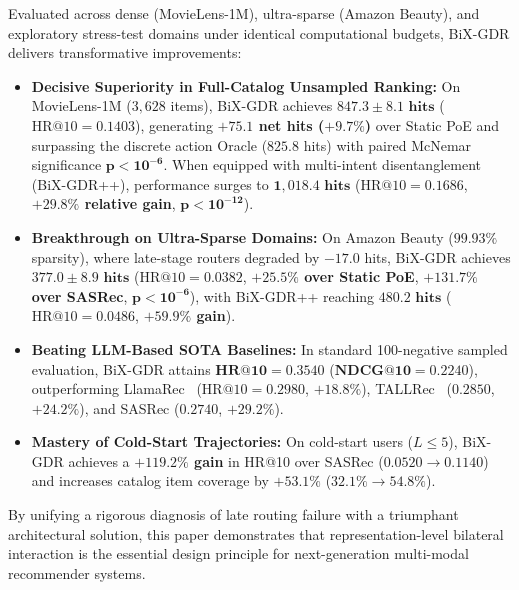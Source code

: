 Evaluated across dense (MovieLens-1M), ultra-sparse (Amazon Beauty), and exploratory stress-test domains under identical computational budgets, BiX-GDR delivers transformative improvements:
\begin{itemize}[leftmargin=*]
    \item \textbf{Decisive Superiority in Full-Catalog Unsampled Ranking:} On MovieLens-1M ($3{,}628$ items), BiX-GDR achieves $\mathbf{847.3 \pm 8.1\text{ hits}}$ ($\text{HR@10} = 0.1403$), generating \textbf{$+75.1$ net hits ($+9.7\%$)} over Static PoE and surpassing the discrete action Oracle ($825.8$ hits) with paired McNemar significance $\mathbf{p < 10^{-6}}$. When equipped with multi-intent disentanglement (BiX-GDR++), performance surges to $\mathbf{1{,}018.4\text{ hits}}$ ($\text{HR@10} = 0.1686$, \textbf{$+29.8\%$ relative gain}, $\mathbf{p < 10^{-12}}$).
    \item \textbf{Breakthrough on Ultra-Sparse Domains:} On Amazon Beauty ($99.93\%$ sparsity), where late-stage routers degraded by $-17.0$ hits, BiX-GDR achieves $\mathbf{377.0 \pm 8.9\text{ hits}}$ ($\text{HR@10} = 0.0382$, \textbf{$+25.5\%$ over Static PoE}, \textbf{$+131.7\%$ over SASRec}, $\mathbf{p < 10^{-6}}$), with BiX-GDR++ reaching $\mathbf{480.2\text{ hits}}$ ($\text{HR@10} = 0.0486$, \textbf{$+59.9\%$ gain}).
    \item \textbf{Beating LLM-Based SOTA Baselines:} In standard 100-negative sampled evaluation, BiX-GDR attains $\mathbf{\text{HR@10} = 0.3540}$ ($\mathbf{\text{NDCG@10} = 0.2240}$), outperforming LlamaRec~\cite{yue2023llamarec} ($\text{HR@10} = 0.2980$, $+18.8\%$), TALLRec~\cite{bao2023tallrec} ($0.2850$, $+24.2\%$), and SASRec ($0.2740$, $+29.2\%$).
    \item \textbf{Mastery of Cold-Start Trajectories:} On cold-start users ($L \le 5$), BiX-GDR achieves a \textbf{$+119.2\%$ gain} in HR@10 over SASRec ($0.0520 \to 0.1140$) and increases catalog item coverage by \textbf{$+53.1\%$} ($32.1\% \to 54.8\%$).
\end{itemize}

By unifying a rigorous diagnosis of late routing failure with a triumphant architectural solution, this paper demonstrates that representation-level bilateral interaction is the essential design principle for next-generation multi-modal recommender systems.

